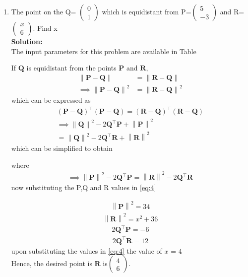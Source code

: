 \documentclass[12pt]{article}
\providecommand{\brak}[1]{\ensuremath{\left(#1\right)}}
\providecommand{\norm}[1]{\left\lVert#1\right\rVert}
\newcommand{\solution}{\noindent \textbf{Solution: }}
\newcommand{\myvec}[1]{\ensuremath{\begin{pmatrix}#1\end{pmatrix}}}
\let\vec\mathbf
\begin{document}
\begin{enumerate}

\item The point on the Q= $\myvec{0\\ 1}$ which is equidistant from P=$\myvec{5 \\ -3}$ and R=$\myvec{x\\6}$. Find x\\

\solution \\The input parameters for this problem are available in Table 
\begin{table}[ht!]

\caption{}
\label{Table-1}	
\end{table}


  If $\vec{Q}$  is  equidistant from the points $\vec{P}$ and $\vec{R}$, 
\begin{align}
 \norm{\vec{P}-\vec{Q}} &=
\norm{\vec{R}-\vec{Q}} 
\\
 \implies \norm{\vec{P}-\vec{Q}}^2 &=
\norm{\vec{R}-\vec{Q}}^2 
\end{align}
which can be expressed as 
\begin{multline}
 \brak{\vec{P}-\vec{Q}}^{\top} \brak{\vec{P}-\vec{Q}}=
 \brak{\vec{R}-\vec{Q}}^{\top} 
\brak{\vec{R}-\vec{Q}}
\\
 \implies \norm{\vec{Q}}^2-2{\vec{Q}}^{\top}\vec{P} + \norm{\vec{P}}^2
 \\= \norm{\vec{Q}}^2-2{\vec{Q}}^{\top}\vec{R} + \norm{\vec{R}}^2
\end{multline}
which can be simplified to obtain
  
  where 
  \begin{align}
   \implies \norm{\vec{P}}^2-2{\vec{Q}}^{\top}\vec{P} = \norm{\vec{R}}^2-2{\vec{Q}}^{\top}\vec{R} 
\label{eq:4} 
  \end{align}
  now substituting the P,Q and R values in \eqref{eq:4}

  \begin{align}
   \norm{\vec{P}}^2 = 34
    \end{align}
 \begin{align}
   \norm{\vec{R}}^2 = x^2+36
    \end{align}
  \begin{align}
 2{\vec{Q}}^{\top}\vec{P}= -6
\end{align}
\begin{align}
 2{\vec{Q}}^{\top}\vec{R}= 12
\end{align}
upon   substituting the values in \eqref{eq:4} the value of $x$ = $ 4$
\\Hence, the desired point is $\vec{R}$ is$\myvec{ 4 \\ 6}$.


\end{enumerate}
\end{document}
